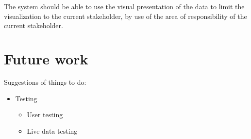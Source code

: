 The system should be able to use the visual presentation of the data to limit
the visualization to the current stakeholder, by use of the area of
responsibility of the current stakeholder.

\section{Future work} %
\label{sec:future_work}

Suggestions of things to do:
\begin{itemize}
	\item Testing
	\begin{itemize}
		\item User testing
		\item Live data testing
	\end{itemize}
\end{itemize}

%

